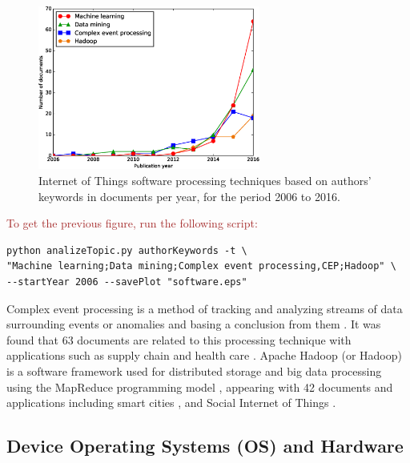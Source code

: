 \documentclass[symmetry,article,accept,moreauthors,pdftex10pt,a4paper]{mdpi}
\newcommand{\figuresWidth}{0.65\textwidth}
\begin{document}
\begin{figure}[H]
	\centering
	\includegraphics[width=\figuresWidth]{./graphs/figure7.eps}
	\caption{Internet of Things software processing techniques based on authors' keywords in documents per year, for the period 2006 to 2016.}
	\label{fig_software_processing}
\end{figure} 

\noindent
\textcolor{brown}{To get the previous figure, run the following script:}\\
\begin{verbatim}
python analizeTopic.py authorKeywords -t \
"Machine learning;Data mining;Complex event processing,CEP;Hadoop" \
--startYear 2006 --savePlot "software.eps"
\end{verbatim}

Complex event processing is a method of tracking and analyzing streams of data surrounding events or anomalies and basing a conclusion from them \cite{Luckham:2001:PEI:515781}. It was found that 63 documents are related to this processing  technique with applications such as supply chain \cite{Li20131481,li2013,Liu2015} and health care \cite{Mohamedali201650,Sheriff2015}. Apache Hadoop (or Hadoop) is a software framework used for distributed storage and big data processing using the MapReduce programming model \cite{White:2009:HDG:1717298}, appearing with 42 documents and applications including smart cities \cite{Ji201422372,Hans2016352,TahmassebpourS1442}, and Social Internet of Things \cite{Ahmad20161101}.


\subsection{Device Operating Systems (OS) and Hardware}
\end{document}
